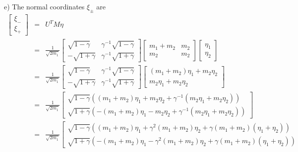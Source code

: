\documentclass[letterpaper,11pt]{article}
\begin{document}
e) The normal coordinates $\xi_\pm$ are
\begin{eqnarray*}
 \left[ \begin{array}{c}
  \xi_- \\
  \xi_+
 \end{array} \right] & = & U^T M \eta \\
 & = & \frac{1}{\sqrt{2 m_1}}
        \left[ \begin{array}{cc}
         \sqrt{1 - \gamma} & \gamma^{-1} \sqrt{1 - \gamma} \\
         - \sqrt{1 + \gamma} & \gamma^{-1} \sqrt{1 + \gamma}
        \end{array} \right]
        \left[ \begin{array}{cc}
         m_1 + m_2 & m_2 \\
         m_2 & m_2
        \end{array} \right]
        \left[ \begin{array}{c}
         \eta_1 \\
         \eta_2
        \end{array} \right] \\
 & = & \frac{1}{\sqrt{2 m_1}}
        \left[ \begin{array}{cc}
         \sqrt{1 - \gamma} & \gamma^{-1} \sqrt{1 - \gamma} \\
         - \sqrt{1 + \gamma} & \gamma^{-1} \sqrt{1 + \gamma}
        \end{array} \right]
        \left[ \begin{array}{c}
         (m_1 + m_2) \eta_1 + m_2 \eta_2 \\
         m_2 \eta_1 + m_2 \eta_2
        \end{array} \right] \\
 & = & \frac{1}{\sqrt{2 m_1}}
        \left[ \begin{array}{c}
         \sqrt{1 - \gamma} \left(  (m_1 + m_2) \eta_1 + m_2 \eta_2 + \gamma^{-1} (m_2 \eta_1 + m_2 \eta_2)\right) \\
         \sqrt{1 + \gamma} \left(- (m_1 + m_2) \eta_1 - m_2 \eta_2 + \gamma^{-1} (m_2 \eta_1 + m_2 \eta_2)\right)
        \end{array} \right] \\
 & = & \frac{1}{\sqrt{2 m_1}}
        \left[ \begin{array}{c}
         \sqrt{1 - \gamma} \left(  (m_1 + m_2) \eta_1 + \gamma^2 (m_1 + m_2) \eta_2 + \gamma (m_1 + m_2) (\eta_1 + \eta_2)\right) \\
         \sqrt{1 + \gamma} \left(- (m_1 + m_2) \eta_1 - \gamma^2 (m_1 + m_2) \eta_2 + \gamma (m_1 + m_2) (\eta_1 + \eta_2)\right)

\end{array}
\end{eqnarray*}
\end{document}
